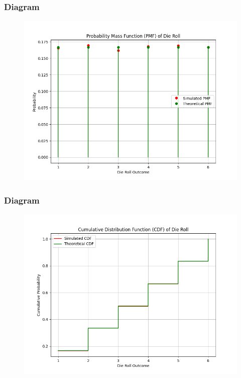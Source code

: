 \documentclass{beamer}
\begin{document}
	\begin{frame}
		\frametitle{Diagram}
		\begin{figure}[!ht]
			\centering
			\includegraphics[width=\linewidth]{figs/Fig1.png}
		\end{figure}
	\end{frame}
	\begin{frame}
		\frametitle{Diagram}
		\begin{figure}[!ht]
			\centering
			\includegraphics[width=\linewidth]{figs/Fig2.png}
		\end{figure}
	\end{frame}
\end{document}
